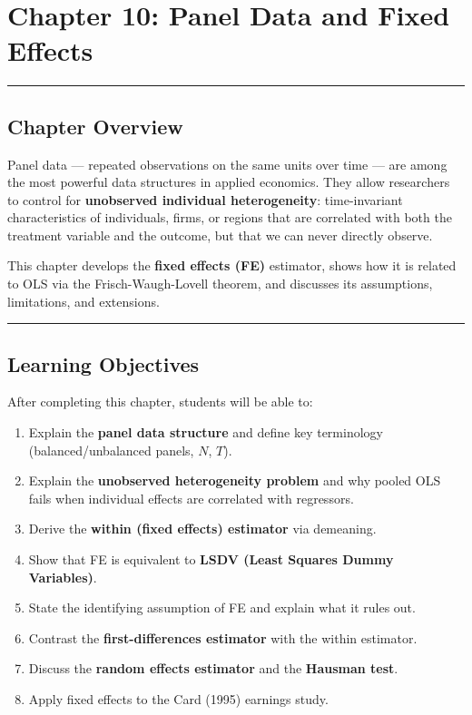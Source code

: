 \chapter{Chapter 10: Panel Data and Fixed Effects}

\medskip\hrule\medskip

\section{Chapter Overview}

Panel data --- repeated observations on the same units over time --- are among the most powerful data structures in applied economics. They allow researchers to control for \textbf{unobserved individual heterogeneity}: time-invariant characteristics of individuals, firms, or regions that are correlated with both the treatment variable and the outcome, but that we can never directly observe.

This chapter develops the \textbf{fixed effects (FE)} estimator, shows how it is related to OLS via the Frisch-Waugh-Lovell theorem, and discusses its assumptions, limitations, and extensions.

\medskip\hrule\medskip

\section{Learning Objectives}

After completing this chapter, students will be able to:

\begin{enumerate}
\item Explain the \textbf{panel data structure} and define key terminology (balanced/unbalanced panels, $N$, $T$).
\item Explain the \textbf{unobserved heterogeneity problem} and why pooled OLS fails when individual effects are correlated with regressors.
\item Derive the \textbf{within (fixed effects) estimator} via demeaning.
\item Show that FE is equivalent to \textbf{LSDV (Least Squares Dummy Variables)}.
\item State the identifying assumption of FE and explain what it rules out.
\item Contrast the \textbf{first-differences estimator} with the within estimator.
\item Discuss the \textbf{random effects estimator} and the \textbf{Hausman test}.
\item Apply fixed effects to the Card (1995) earnings study.
\end{enumerate}

